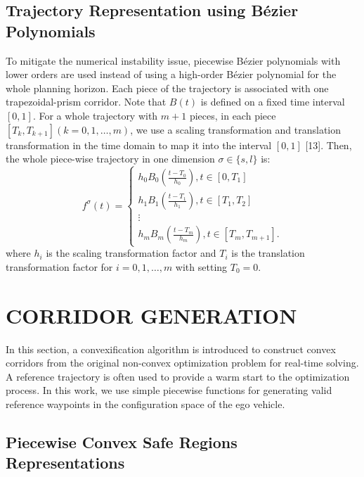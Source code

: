 \documentclass[journal,a4paper,onecolumn,12pt]{IEEEtran}
\begin{document}
\subsection{Trajectory Representation using B\'{e}zier Polynomials}
To mitigate the numerical instability issue, piecewise B\'{e}zier polynomials with lower orders are used instead of using a high-order B\'{e}zier polynomial for the whole planning horizon. Each piece of the trajectory is associated with one trapezoidal-prism corridor. Note that $B(t)$ is defined on a fixed time interval $[0,1]$. For a whole trajectory with $m+1$ pieces, in each piece $\left[T_{k}, T_{k+1}\right] (k = 0,1,\ldots,m)$, we use a scaling transformation and translation transformation in the time domain to map it into the interval $[0,1]$ [13]. Then, the whole piece-wise trajectory in one dimension $\sigma\in\{s,l\}$ is:
$$
f^{\sigma}(t)=\left\{\begin{array}{c}
h_{0} B_{0}\left(\frac{t-T_{0}}{h_{0}}\right), t \in\left[0, T_{1}\right] \\
h_{1} B_{1}\left(\frac{t-T_{1}}{h_{1}}\right), t \in\left[T_{1}, T_{2}\right] \\
\vdots \\
h_{m} B_{m}\left(\frac{t-T_{m}}{h_{m}}\right), t \in\left[T_{m}, T_{m+1}\right] .
\end{array}\right.
$$
where $h_i$ is the scaling transformation factor and $T_i$ is the translation transformation factor for $i = 0,1,\ldots,m$ with setting $T_0 = 0$.

\section{CORRIDOR GENERATION}

In this section, a convexification algorithm is introduced to construct convex corridors from the original non-convex optimization problem for real-time solving. A reference trajectory is often used to provide a warm start to the optimization process. In this work, we use simple piecewise functions for generating valid reference waypoints in the configuration space of the ego vehicle.

\subsection{Piecewise Convex Safe Regions Representations}
\end{document}
